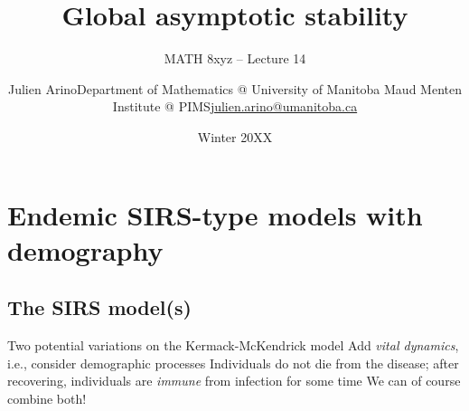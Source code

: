 \documentclass[aspectratio=169]{beamer}\usepackage[]{graphicx}\usepackage[]{xcolor}
\subtitle{MATH 8xyz -- Lecture 14}
\author{\texorpdfstring{Julien Arino\newline Department of Mathematics @ University of Manitoba \newline Maud Menten Institute @ PIMS\newline\url{julien.arino@umanitoba.ca}}{Julien Arino}}
\date{Winter 20XX}
\title{Global asymptotic stability}
\begin{document}


\section{Endemic SIRS-type models with demography}

\subsection{The SIRS model(s)}
\begin{frame}{Two potential variations on the Kermack-McKendrick model}
\bbullet Add \emph{vital dynamics}, i.e., consider demographic processes
\vfill
\bbullet Individuals do not die from the disease; after recovering, individuals are \emph{immune} from infection for some time
\vfill
\bbullet We can of course combine both!
\end{frame}
\end{document}
